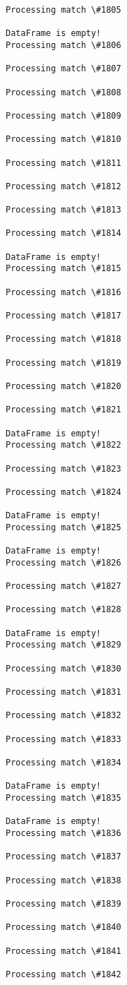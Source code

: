 \documentclass[11pt]{article}
\begin{document}
\begin{Verbatim}[commandchars=\\\{\}]
Processing match \#1805

DataFrame is empty!
Processing match \#1806

Processing match \#1807

Processing match \#1808

Processing match \#1809

Processing match \#1810

Processing match \#1811

Processing match \#1812

Processing match \#1813

Processing match \#1814

DataFrame is empty!
Processing match \#1815

Processing match \#1816

Processing match \#1817

Processing match \#1818

Processing match \#1819

Processing match \#1820

Processing match \#1821

DataFrame is empty!
Processing match \#1822

Processing match \#1823

Processing match \#1824

DataFrame is empty!
Processing match \#1825

DataFrame is empty!
Processing match \#1826

Processing match \#1827

Processing match \#1828

DataFrame is empty!
Processing match \#1829

Processing match \#1830

Processing match \#1831

Processing match \#1832

Processing match \#1833

Processing match \#1834

DataFrame is empty!
Processing match \#1835

DataFrame is empty!
Processing match \#1836

Processing match \#1837

Processing match \#1838

Processing match \#1839

Processing match \#1840

Processing match \#1841

Processing match \#1842


\end{Verbatim}
\end{document}
